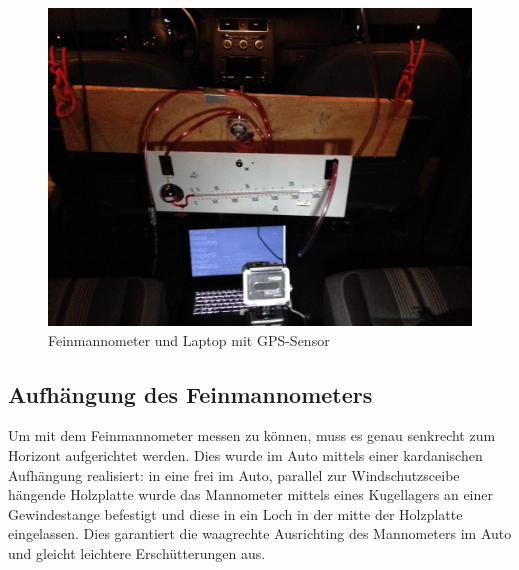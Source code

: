 \begin{figure}
\centering
	\includegraphics[width=\textwidth]{images/messung.jpg}
	\caption{Feinmannometer und Laptop mit GPS-Sensor}
	\label{messung}
\end{figure}

\subsection{Aufhängung des Feinmannometers}
Um mit dem Feinmannometer messen zu können, muss es genau senkrecht zum Horizont aufgerichtet werden. Dies wurde im Auto mittels einer kardanischen Aufhängung realisiert: in eine frei im Auto, parallel zur Windschutzsceibe hängende Holzplatte wurde das Mannometer mittels eines Kugellagers an einer Gewindestange befestigt und diese in ein Loch in der mitte der Holzplatte eingelassen. Dies garantiert die waagrechte Ausrichting des Mannometers im Auto und gleicht leichtere Erschütterungen aus. 
